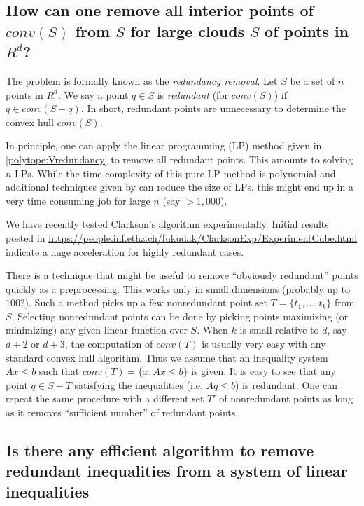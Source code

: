 \documentclass[a4paper,12pt]{article}
\begin{document}
\subsection{How can one remove all interior points of $conv(S)$ from $S$ 
for large clouds $S$ of points in $R^d$?}
\label{polytope:Vredundancy2}

The problem is formally known as the {\em redundancy removal}.
Let $S$ be a set of $n$ points in $R^d$.
We say a point $q \in S$ is {\em redundant\/} (for $conv(S)$) if
$q \in conv(S-q)$.   In short, redundant points are unnecessary
to determine the convex hull $conv(S)$.

In principle, one can apply the linear programming (LP)
 method given in \ref{polytope:Vredundancy}
to remove all redundant points.  This amounts to solving $n$ LPs.
  While the time complexity of this pure LP method is polynomial and
additional techniques given by \cite{c-mosga-94,oss-eephd-95} 
can reduce the size of LPs, 
this might end up in
 a very time consuming job for large $n$ (say $>1,000$).
 
 We have recently tested Clarkson's algorithm \cite{c-mosga-94} 
 experimentally.  Initial results posted in 
\url{https://people.inf.ethz.ch/fukudak/ClarksonExp/ExperimentCube.html}\\
indicate a huge acceleration for highly redundant cases. 

There is a technique that might be useful to remove
``obviously redundant'' points quickly as a preprocessing.
This works only in small dimensions (probably up to $100$?).
Such a method 
picks up a few nonredundant point set $T=\{t_1, \ldots, t_k\}$ from $S$.
Selecting nonredundant points can be done by picking points 
maximizing (or minimizing) any given linear function over $S$.
When $k$ is small relative to $d$, say $d+2$ or $d+3$, the computation
of $conv(T)$ is usually very easy with any standard convex hull
algorithm.   Thus we assume that  an inequality
system $A x \le b$ such that $conv(T)=\{x: A x \le b\}$ is given.
It is easy to see that any point $q \in S-T$ satisfying
the inequalities (i.e. $A q \le b$) is redundant. 
One can repeat the same procedure with a different set
$T'$ of nonredundant points as long as it removes 
``sufficient number'' of redundant points.

\subsection{Is there any efficient algorithm to remove
redundant inequalities from a system of linear inequalities}
\label{polytope:Hredundancy}
\end{document}
